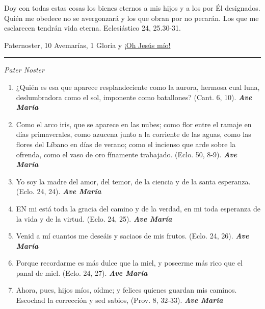 \documentclass[a4paper,11pt, oneside]{report}
\begin{document}
{{      \medskip
      Doy con todas estas cosas los bienes eternos a mis hijos y a los por Él designados. Quién me obedece no se avergonzará y los que obran por
      no pecarán. Los que me esclarecen tendrán vida eterna. Eclesiástico 24, 25.30-31.

       Paternoster, 10 Avemarías, 1 Gloria y \hyperlink{finalCoronacion}{¡Oh Jesús mío!}

      \begin{center}\rule{1\linewidth}{\linethickness}\end{center}

      \medskip
      \textit{Pater Noster}

      \begin{enumerate}

        \item ¿Quién es esa que aparece resplandeciente como la aurora, hermosa cual luna, deslumbradora como el sol, imponente como batallones? 
        (Cant. 6, 10). \textbf{\textit{Ave María}}

        \item Como el arco iris, que se aparece en las nubes; como flor entre el ramaje en días primaverales, como azucena junto
        a la corriente de las aguas, como las flores del Líbano en días de verano; como el incienso que arde sobre la ofrenda,
        como el vaso de oro fínamente trabajado. (Eclo. 50, 8-9). \textbf{\textit{Ave María}}

        \item Yo soy la madre del amor, del temor, de la ciencia y de la santa esperanza. 
        (Eclo. 24, 24). \textbf{\textit{Ave María}}

        \item EN mi está toda la gracia del camino y de la verdad, en mi toda esperanza de la vida y de la virtud. 
        (Eclo. 24, 25). \textbf{\textit{Ave María}}

        \item Venid a mí cuantos me deseáis y saciaos de mis frutos. 
        (Eclo. 24, 26). \textbf{\textit{Ave María}}

        \item Porque recordarme es más dulce que la miel, y poseerme más rico que el panal de miel. 
        (Eclo. 24, 27). \textbf{\textit{Ave María}}

        \item Ahora, pues, hijos míos, oídme; y felices quienes guardan mis caminos. Escochad la corrección y sed sabios, 
        (Prov. 8, 32-33). \textbf{\textit{Ave María}}


\end{enumerate}}}
\end{document}
